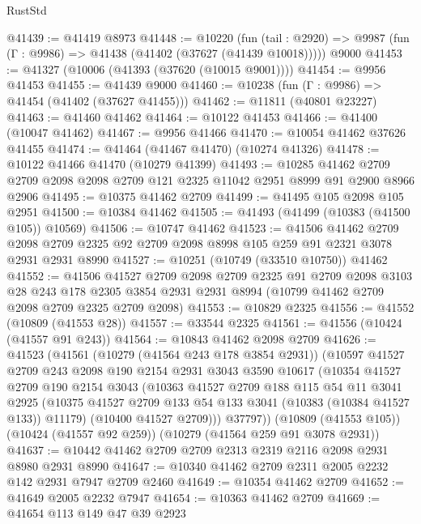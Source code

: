 \begin{lexlean}{RustStd}
\begin{coremodule}
@41439 := @41419 @8973
@41448 := @10220
    (fun (tail : @2920) => @9987 (fun (Γ : @9986) => @41438 (@41402 (@37627 (@41439 @10018)))))
    @9000
@41453 := @41327 (@10006 (@41393 (@37620 (@10015 @9001))))
@41454 := @9956 @41453
@41455 := @41439 @9000
@41460 := @10238 (fun (Γ : @9986) => @41454 (@41402 (@37627 @41455)))
@41462 := @11811 (@40801 @23227)
@41463 := @41460 @41462
@41464 := @10122 @41453
@41466 := @41400 (@10047 @41462)
@41467 := @9956 @41466
@41470 := @10054 @41462 @37626 @41455
@41474 := @41464 (@41467 @41470) (@10274 @41326)
@41478 := @10122 @41466 @41470 (@10279 @41399)
@41493 := @10285
    @41462
    @2709
    @2709
    @2098
    @2098
    @2709
    @121
    @2325
    @11042
    @2951
    @8999
    @91
    @2900
    @8966
    @2906
@41495 := @10375 @41462 @2709
@41499 := @41495 @105 @2098 @105 @2951
@41500 := @10384 @41462
@41505 := @41493 (@41499 (@10383 (@41500 @105)) @10569)
@41506 := @10747 @41462
@41523 := @41506
    @41462
    @2709
    @2098
    @2709
    @2325
    @92
    @2709
    @2098
    @8998
    @105
    @259
    @91
    @2321
    @3078
    @2931
    @2931
    @8990
@41527 := @10251 (@10749 (@33510 @10750)) @41462
@41552 := @41506
    @41527
    @2709
    @2098
    @2709
    @2325
    @91
    @2709
    @2098
    @3103
    @28
    @243
    @178
    @2305
    @3854
    @2931
    @2931
    @8994
    (@10799 @41462 @2709 @2098 @2709 @2325 @2709 @2098)
@41553 := @10829 @2325
@41556 := @41552 (@10809 (@41553 @28))
@41557 := @33544 @2325
@41561 := @41556 (@10424 (@41557 @91 @243))
@41564 := @10843 @41462 @2098 @2709
@41626 := @41523
    (@41561
      (@10279 (@41564 @243 @178 @3854 @2931))
      (@10597
        @41527
        @2709
        @243
        @2098
        @190
        @2154
        @2931
        @3043
        @3590
        @10617
        (@10354
          @41527
          @2709
          @190
          @2154
          @3043
          (@10363
            @41527
            @2709
            @188
            @115
            @54
            @11
            @3041
            @2925
            (@10375 @41527 @2709 @133 @54 @133 @3041 (@10383 (@10384 @41527 @133)) @11179)
            (@10400 @41527 @2709)))
        @37797))
    (@10809 (@41553 @105))
    (@10424 (@41557 @92 @259))
    (@10279 (@41564 @259 @91 @3078 @2931))
@41637 := @10442 @41462 @2709 @2709 @2313 @2319 @2116 @2098 @2931 @8980 @2931 @8990
@41647 := @10340 @41462 @2709 @2311 @2005 @2232 @142 @2931 @7947 @2709 @2460
@41649 := @10354 @41462 @2709
@41652 := @41649 @2005 @2232 @7947
@41654 := @10363 @41462 @2709
@41669 := @41654
    @113
    @149
    @47
    @39
    @2923

\end{coremodule}
\end{lexlean}
